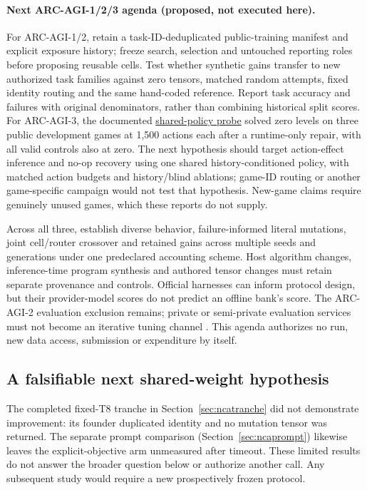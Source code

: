 \documentclass[11pt]{article}
\begin{document}
\paragraph{Next ARC-AGI-1/2/3 agenda (proposed, not executed here).}
For ARC-AGI-1/2, retain a task-ID-deduplicated public-training manifest and explicit exposure
history; freeze search, selection and untouched reporting roles before proposing reusable cells.
Test whether synthetic gains transfer to new authorized task families against zero tensors,
matched random attempts, fixed identity routing and the same hand-coded reference. Report task
accuracy and failures with original denominators, rather than combining historical split scores.
For ARC-AGI-3, the documented
\href{https://github.com/Sanokei/CellForge/blob/02beaf18251fca5ed1f1eb55e92f00a3e3820e88/reports/ARC3_SHARED_PROBE_20261002.md}{shared-policy probe} solved zero levels on
three public development games at 1{,}500 actions each after a runtime-only repair, with all
valid controls also at zero. The next hypothesis should target action-effect inference and
no-op recovery using one shared history-conditioned policy, with matched action budgets and
history/blind ablations; game-ID routing or another game-specific campaign would not test that
hypothesis. New-game claims require genuinely unused games, which these reports do not supply.

Across all three, establish diverse behavior, failure-informed literal mutations, joint
cell/router crossover and retained gains across multiple seeds and generations under one
predeclared accounting scheme. Host algorithm changes, inference-time program synthesis and
authored tensor changes must retain separate provenance and controls. Official harnesses can
inform protocol design, but their provider-model scores do not predict an offline bank's score.
The ARC-AGI-2 evaluation exclusion remains; private or semi-private evaluation services must
not become an iterative tuning channel \cite{arcpolicy}. This agenda authorizes no run, new
data access, submission or expenditure by itself.

\subsection{A falsifiable next shared-weight hypothesis}
The completed fixed-T8 tranche in Section~\ref{sec:ncatranche} did not demonstrate improvement:
its founder duplicated identity and no mutation tensor was returned. The separate
prompt comparison (Section~\ref{sec:ncaprompt}) likewise leaves the explicit-objective arm
unmeasured after timeout. These limited results do not answer the broader question below or
authorize another call. Any subsequent study would require a new prospectively frozen protocol.
\end{document}
